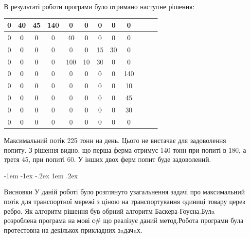 \documentclass[a4paper,14pt,russian,ukrainian,oneside,final]{extreport}
\makeatletter
\newlength{\fivecharsapprox}
\newlength{\fivecharsapproxs}
\renewcommand\section{%
  \clearpage\@startsection {section}{0}%
    {\fivecharsapproxs}%
    {-1em \@plus -1ex \@minus -.2ex}%
    {1em \@plus .2ex}%
    {\raggedright\hyphenpenalty=10000\normalfont\large\bfseries\MakeUppercase {}}
}
\newcommand\sectioncentered{%
  \clearpage\@startsection {section}{1}%
    {\z@}%
    {-1em \@plus -1ex \@minus -.2ex}%
    {1em \@plus .2ex}%
    {\centering\hyphenpenalty=10000\normalfont\large\bfseries\MakeUppercase}%
    }
\makeatother
\begin{document}
\indent В результаті роботи програми було отримано наступне рішення:
\begin{center}
\begin{tabular}{|c|c|c|c|c|c|c|c|c|c|c|c|}
\hline
0&40&45&140&0&0&0&0&0 \\ \hline
0&0&0&0&40&0&0&0&0 \\ \hline
0&0&0&0&0&0&15&30&0 \\ \hline
0&0&0&0&100&10&30&0&0 \\ \hline
0&0&0&0&0&0&0&0&140 \\ \hline
0&0&0&0&0&0&0&0&10 \\ \hline
0&0&0&0&0&0&0&0&45 \\ \hline
0&0&0&0&0&0&0&0&30 \\ \hline
0&0&0&0&0&0&0&0&0 \\ \hline
\end{tabular}
\end{center}
Максимальний потік 225 тонн на день. 
Цього не вистачає для задоволення попиту. 
З рішення видно, що перша ферма отримує 140 тонн при попиті в 180, а третя 45, при попиті 60. 
У інших двох ферм попит буде задоволений.

\newpage
\section{Висновки}
У даній роботі було розглянуто узагальнення задачі про максимальний потік для транспортної мережі з ціною на транспортування одиниці товару церез ребро. Як алгоритм рішення був обрний алгоритм Баскера-Гоуєна.Булa розроблена програма на мові с\# що реалізує даний метод.Робота програми була протестовна на декількох прикладних зaдачaх.

\newpage
\renewcommand{\bibsection}{\sectioncentered*{Cписок використанної літератури}}
\end{document}
